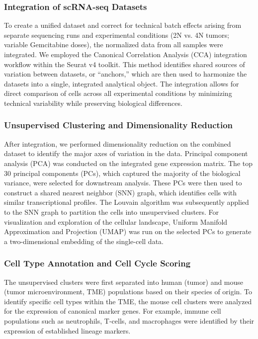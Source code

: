 \documentclass[11pt,notitlepage]{article}
\begin{document}
\subsubsection{Integration of scRNA-seq Datasets}
To create a unified dataset and correct for technical batch effects arising from separate sequencing runs and experimental conditions (2N vs. 4N tumors; variable Gemcitabine doses), the normalized data from all samples were integrated. We employed the Canonical Correlation Analysis (CCA) integration workflow within the Seurat v4 toolkit. This method identifies shared sources of variation between datasets, or ``anchors,'' which are then used to harmonize the datasets into a single, integrated analytical object. The integration allows for direct comparison of cells across all experimental conditions by minimizing technical variability while preserving biological differences.


\subsubsection{Unsupervised Clustering and Dimensionality Reduction}
After integration, we performed dimensionality reduction on the combined dataset to identify the major axes of variation in the data. Principal component analysis (PCA) was conducted on the integrated gene expression matrix. The top 30 principal components (PCs), which captured the majority of the biological variance, were selected for downstream analysis. These PCs were then used to construct a shared nearest neighbor (SNN) graph, which identifies cells with similar transcriptional profiles. The Louvain algorithm was subsequently applied to the SNN graph to partition the cells into unsupervised clusters. For visualization and exploration of the cellular landscape, Uniform Manifold Approximation and Projection (UMAP) was run on the selected PCs to generate a two-dimensional embedding of the single-cell data.

\subsubsection{Cell Type Annotation and Cell Cycle Scoring}
The unsupervised clusters were first separated into human (tumor) and mouse (tumor microenvironment, TME) populations based on their species of origin. To identify specific cell types within the TME, the mouse cell clusters were analyzed for the expression of canonical marker genes. For example, immune cell populations such as neutrophils, T-cells, and macrophages were identified by their expression of established lineage markers.
\end{document}
